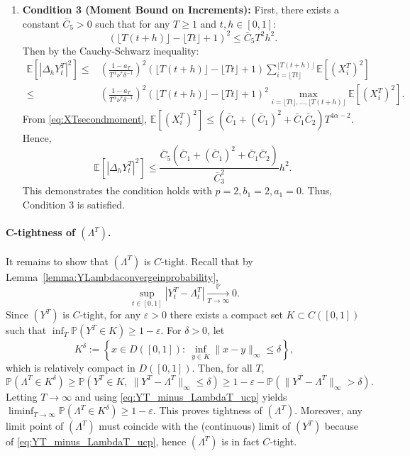 \documentclass[letterpaper]{article}
\numberwithin{equation}{section}
\theoremstyle{definition}
\theoremstyle{remark}
\begin{document}
\begin{enumerate}
        \item \textbf{Condition 3 (Moment Bound on Increments):} First, there exists a constant $\bar C_5>0$ such that for any $T\ge1$ and $t,h\in[0,1]$:
              \[
                (\lfloor T(t+h) \rfloor - \lfloor Tt \rfloor + 1)^2\le \bar C_5 T^2h^2.
              \]
              Then by the Cauchy-Schwarz inequality:
              \begin{align*}
                \mathbb E\left[ \left| \Delta_h Y_t^T\right|^2 \right]
                \le &\left(\frac{1-a_T}{T^\alpha \nu^* \delta^{-1}}\right)^2 ( \lfloor T(t+h) \rfloor-\lfloor Tt \rfloor+1 ) \sum_{i=\lfloor Tt \rfloor}^{\lfloor T(t+h) \rfloor}\mathbb E\left[ (X_i^T)^2 \right]\\
                \le &\left(\frac{1-a_T}{T^\alpha \nu^* \delta^{-1}}\right)^2 ( \lfloor T(t+h) \rfloor-\lfloor Tt \rfloor+1 )^2\max_{i=\lfloor Tt \rfloor,\dots,\lfloor T(t+h) \rfloor}\mathbb E\left[ (X_i^T)^2 \right].
              \end{align*}
              From \eqref{eq:XTsecondmoment}, $\mathbb E[(X_i^T)^2] \le \left(\bar C_1+(\bar C_1)^2+\bar C_1\bar C_2\right) T^{4\alpha-2}$. Hence,
              \[
                \mathbb E\left[ \left| \Delta_h Y_t^T\right|^2 \right]
                \le \frac{\bar C_5(\bar C_1+(\bar C_1)^2+\bar C_1\bar C_2)}{\bar C_3^2}h^2.
              \]
              This demonstrates the condition holds with $p=2, b_1=2, a_1=0$. Thus, Condition 3 is satisfied.
      \end{enumerate}

      {
      \paragraph{C-tightness of \texorpdfstring{$(\Lambda^T)$}{LambdaT}.}
      It remains to show that $(\Lambda^T)$ is $C$-tight.
      Recall that by Lemma~\ref{lemma:YLambdaconvergeinprobability},
      \begin{equation}\label{eq:YT_minus_LambdaT_ucp}
        \sup_{t\in[0,1]}\left|Y_t^T-\Lambda_t^T\right|\xrightarrow[T\to\infty]{\mathbb P}0.
      \end{equation}
      Since $(Y^T)$ is $C$-tight, for any $\varepsilon>0$ there exists a compact set $K\subset C([0,1])$
      such that $\inf_T\mathbb P(Y^T\in K)\ge 1-\varepsilon$.
      For $\delta>0$, let
      \[
        K^\delta:=\left\{x\in D([0,1]):\ \inf_{y\in K}\|x-y\|_\infty\le \delta\right\},
      \]
      which is relatively compact in $D([0,1])$.
      Then, for all $T$,
      \[
        \mathbb P(\Lambda^T\in K^\delta)
        \ge \mathbb P\left(Y^T\in K,\ \|Y^T-\Lambda^T\|_\infty\le \delta\right)
        \ge 1-\varepsilon-\mathbb P\left(\|Y^T-\Lambda^T\|_\infty>\delta\right).
      \]
      Letting $T\to\infty$ and using \eqref{eq:YT_minus_LambdaT_ucp} yields
      $\liminf_{T\to\infty}\mathbb P(\Lambda^T\in K^\delta)\ge 1-\varepsilon$.
      This proves tightness of $(\Lambda^T)$.
      Moreover, any limit point of $(\Lambda^T)$ must coincide with the (continuous) limit of $(Y^T)$
      because of \eqref{eq:YT_minus_LambdaT_ucp}, hence $(\Lambda^T)$ is in fact $C$-tight.
      }
\end{document}
